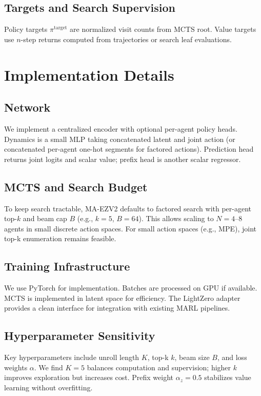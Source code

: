 \documentclass{article}
\begin{document}
\subsection{Targets and Search Supervision}
Policy targets $\pi^{\text{target}}$ are normalized visit counts from MCTS root. Value targets use $n$-step returns computed from trajectories or search leaf evaluations.

\section{Implementation Details}
\subsection{Network}
We implement a centralized encoder with optional per-agent policy heads. Dynamics is a small MLP taking concatenated latent and joint action (or concatenated per-agent one-hot segments for factored actions). Prediction head returns joint logits and scalar value; prefix head is another scalar regressor.

\subsection{MCTS and Search Budget}
To keep search tractable, MA-EZV2 defaults to factored search with per-agent top-$k$ and beam cap $B$ (e.g., $k=5$, $B=64$). This allows scaling to $N=4\text{--}8$ agents in small discrete action spaces. For small action spaces (e.g., MPE), joint top-k enumeration remains feasible.

\subsection{Training Infrastructure}
We use PyTorch for implementation. Batches are processed on GPU if available. MCTS is implemented in latent space for efficiency. The LightZero adapter provides a clean interface for integration with existing MARL pipelines.

\subsection{Hyperparameter Sensitivity}
Key hyperparameters include unroll length $K$, top-k $k$, beam size $B$, and loss weights $\alpha$. We find $K=5$ balances computation and supervision; higher $k$ improves exploration but increases cost. Prefix weight $\alpha_z=0.5$ stabilizes value learning without overfitting.
\end{document}
